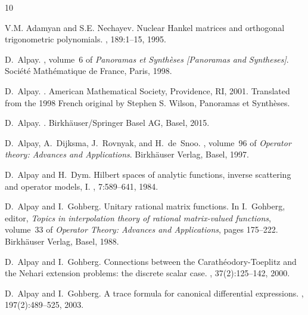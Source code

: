 \documentclass[12pt]{amsart}
\theoremstyle{definition}
\theoremstyle{remark}
\numberwithin{equation}{section}
\begin{document}
\begin{thebibliography}{10}

V.M. Adamyan and S.E. Nechayev.
\newblock Nuclear {H}ankel matrices and orthogonal trigonometric polynomials.
, 189:1--15, 1995.

D.~Alpay.
, volume~6 of {\em Panoramas et Synth\`eses
  [Panoramas and Syntheses]}.
\newblock Soci\'et\'e Math\'ematique de France, Paris, 1998.

D.~Alpay.
.
\newblock American Mathematical Society, Providence, RI, 2001.
\newblock Translated from the 1998 French original by Stephen S. Wilson,
  Panoramas et Synth\`eses.

D.~Alpay.
.
\newblock Birkh\"auser/Springer Basel AG, Basel, 2015.

D.~Alpay, A.~Dijksma, J.~Rovnyak, and H.~de~Snoo.
, volume~96 of {\em Operator theory: {A}dvances and
  {A}pplications}.
\newblock Birkh{\" a}user Verlag, Basel, 1997.

D.~Alpay and H.~Dym.
\newblock Hilbert spaces of analytic functions, inverse scattering and operator
  models, {I}.
, 7:589--641, 1984.

D.~Alpay and I.~Gohberg.
\newblock Unitary rational matrix functions.
\newblock In I.~Gohberg, editor, {\em Topics in interpolation theory of
  rational matrix-valued functions}, volume~33 of {\em { Operator {T}heory:
  {A}dvances and {A}pplications}}, pages 175--222. Birkh{\" a}user Verlag,
  Basel, 1988.

D.~Alpay and I.~Gohberg.
\newblock Connections between the {C}arath\'eodory-{T}oeplitz and the {N}ehari
  extension problems: the discrete scalar case.
, 37(2):125--142, 2000.

D.~Alpay and I.~Gohberg.
\newblock A trace formula for canonical differential expressions.
, 197(2):489--525, 2003.


\end{thebibliography}
\end{document}
